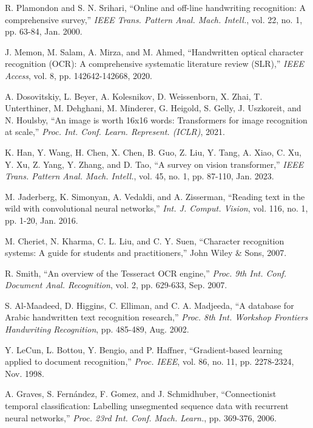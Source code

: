 \documentclass[10pt,twocolumn]{article}
\begin{document}
\begin{thebibliography}{99}

R. Plamondon and S. N. Srihari, ``Online and off-line handwriting recognition: A comprehensive survey,'' \textit{IEEE Trans. Pattern Anal. Mach. Intell.}, vol. 22, no. 1, pp. 63-84, Jan. 2000.

J. Memon, M. Salam, A. Mirza, and M. Ahmed, ``Handwritten optical character recognition (OCR): A comprehensive systematic literature review (SLR),'' \textit{IEEE Access}, vol. 8, pp. 142642-142668, 2020.

A. Dosovitskiy, L. Beyer, A. Kolesnikov, D. Weissenborn, X. Zhai, T. Unterthiner, M. Dehghani, M. Minderer, G. Heigold, S. Gelly, J. Uszkoreit, and N. Houlsby, ``An image is worth 16x16 words: Transformers for image recognition at scale,'' \textit{Proc. Int. Conf. Learn. Represent. (ICLR)}, 2021.

K. Han, Y. Wang, H. Chen, X. Chen, B. Guo, Z. Liu, Y. Tang, A. Xiao, C. Xu, Y. Xu, Z. Yang, Y. Zhang, and D. Tao, ``A survey on vision transformer,'' \textit{IEEE Trans. Pattern Anal. Mach. Intell.}, vol. 45, no. 1, pp. 87-110, Jan. 2023.

M. Jaderberg, K. Simonyan, A. Vedaldi, and A. Zisserman, ``Reading text in the wild with convolutional neural networks,'' \textit{Int. J. Comput. Vision}, vol. 116, no. 1, pp. 1-20, Jan. 2016.

M. Cheriet, N. Kharma, C. L. Liu, and C. Y. Suen, ``Character recognition systems: A guide for students and practitioners,'' John Wiley \& Sons, 2007.

R. Smith, ``An overview of the Tesseract OCR engine,'' \textit{Proc. 9th Int. Conf. Document Anal. Recognition}, vol. 2, pp. 629-633, Sep. 2007.

S. Al-Maadeed, D. Higgins, C. Elliman, and C. A. Madjeeda, ``A database for Arabic handwritten text recognition research,'' \textit{Proc. 8th Int. Workshop Frontiers Handwriting Recognition}, pp. 485-489, Aug. 2002.

Y. LeCun, L. Bottou, Y. Bengio, and P. Haffner, ``Gradient-based learning applied to document recognition,'' \textit{Proc. IEEE}, vol. 86, no. 11, pp. 2278-2324, Nov. 1998.

A. Graves, S. Fernández, F. Gomez, and J. Schmidhuber, ``Connectionist temporal classification: Labelling unsegmented sequence data with recurrent neural networks,'' \textit{Proc. 23rd Int. Conf. Mach. Learn.}, pp. 369-376, 2006.


\end{thebibliography}
\end{document}
